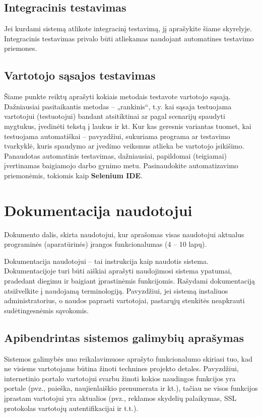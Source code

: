 \documentclass{ktuthesis}
\begin{document}
  \subsection{Integracinis testavimas}

  Jei kurdami sistemą atlikote integracinį testavimą, jį aprašykite šiame skyrelyje. Integracinis testavimas privalo būti atliekamas naudojant automatines testavimo priemones.

  \subsection{Vartotojo sąsajos testavimas}

  Šiame punkte reiktų aprašyti kokiais metodais testavote vartotojo sąsają. Dažniausiai pasitaikantis metodas – „rankinis“, t.y. kai sąsaja testuojama
  vartotojui (testuotojui) bandant atsitiktinai ar pagal scenarijų spaudyti mygtukus, įvedinėti tekstą į laukus ir kt. Kur kas geresnis variantas tuomet,
  kai testuojama automatiškai – pavyzdžiui, sukuriama programa ar testavimo tvarkyklė, kuris spaudymo ar įvedimo veiksmus atlieka be vartotojo įsikišimo.
  Panaudotas automatinis testavimas, dažniausiai, papildomai (teigiamai) įvertinamas baigiamojo darbo gynimo metu. Pasinaudokite automatizavimo priemonėmis,
  tokiomis kaip \textbf{Selenium IDE}.

  \section{Dokumentacija naudotojui}

  Dokumento dalis, skirta naudotojui, kur aprašomas visas naudotojui aktualus programinės (aparatūrinės) įrangos funkcionalumas (4 – 10 lapų).

  Dokumentacija naudotojui – tai instrukcija kaip naudotis sistema. Dokumentacijoje turi būti aiškiai aprašyti naudojimosi sistema ypatumai, pradedant
  diegimu ir baigiant įprastinėmis funkcijomis. Rašydami dokumentaciją atsižvelkite į naudojamą terminologiją. Pavyzdžiui, jei sistemą instaliuos administratorius,
  o naudos paprasti vartotojai, pastarųjų stenkitės neapkrauti sudėtingesnėmis sąvokomis.

  \subsection{Apibendrintas sistemos galimybių aprašymas}

  Sistemos galimybės nuo reikalavimuose aprašyto funkcionalumo skiriasi tuo, kad ne visiems vartotojams būtina žinoti technines projekto detales.
  Pavyzdžiui, internetinio portalo vartotojui svarbu žinoti kokios naudingos funkcijos yra portale (pvz., paieška, naujienlaiškio prenumerata ir kt.),
  tačiau ne visos funkcijos įprastam vartotojui yra aktualios (pvz., reklamos skydelių palaikymas, SSL protokolas vartotojų autentifikacijai ir t.t.).
\end{document}
